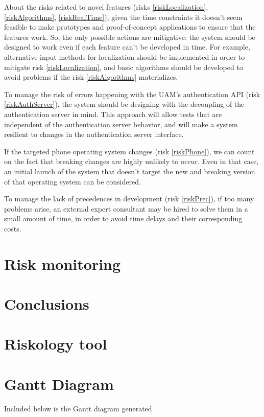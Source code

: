 \documentclass[11pt]{report}
\newcounter{risks}[subsection]
\begin{document}
About the risks related to novel features (risks \ref{riskLocalization}, \ref{riskAlgorithms}, \ref{riskRealTime}), given the time constraints it doesn't seem feasible to make prototypes and proof-of-concept applications to ensure that the features work. So, the only possible actions are mitigative: the system should be designed to work even if each feature can't be developed in time. For example, alternative input methods for localization should be implemented in order to mitigate risk \ref{riskLocalization}, and basic algorithms should be developed to avoid problems if the risk \ref{riskAlgorithms} materializes.

To manage the risk of errors happening with the UAM's authentication API (risk \ref{riskAuthServer}), the system should be designing with the decoupling of the authentication server in mind. This approach will allow tests that are independent of the authentication server behavior, and will make a system resilient to changes in the authentication server interface.

If the targeted phone operating system changes (risk \ref{riskPhone}), we can count on the fact that breaking changes are highly unlikely to occur. Even in that case, an initial launch of the system that doesn't target the new and breaking version of that operating system can be considered.

To manage the lack of precedences in development (risk \ref{riskPrec}), if too many problems arise, an external expert consultant may be hired to solve them in a small amount of time, in order to avoid time delays and their corresponding costs.


\chapter{Risk monitoring}
\label{chapRiskMonitoring}


\chapter{Conclusions}

\appendix

\chapter{Riskology tool}
\label{chapRiskology}


\chapter{Gantt Diagram}
\label{chapGantt}
Included below is the Gantt diagram generated


\end{document}
